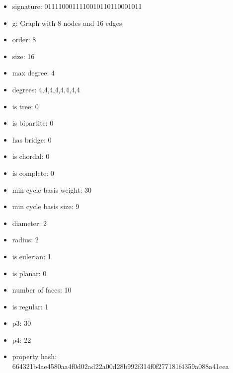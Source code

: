 \begin{itemize}
\item signature: 0111100011110010110110001011
\item g: Graph with 8 nodes and 16 edges
\item order: 8
\item size: 16
\item max degree: 4
\item degrees: 4,4,4,4,4,4,4,4
\item is tree: 0
\item is bipartite: 0
\item has bridge: 0
\item is chordal: 0
\item is complete: 0
\item min cycle basis weight: 30
\item min cycle basis size: 9
\item diameter: 2
\item radius: 2
\item is eulerian: 1
\item is planar: 0
\item number of faces: 10
\item is regular: 1
\item p3: 30
\item p4: 22
\item property hash: 664321b4ae4580aa4f0d02ad22a00d28b992f314f0f277181f4359a088a41eea
\end{itemize}
\newpage
\begin{figure}
\end{figure}
